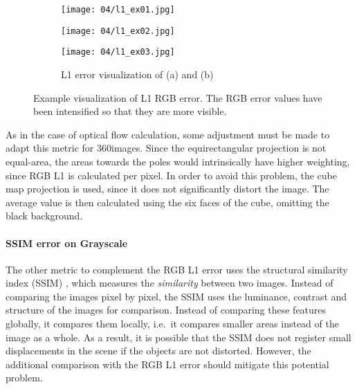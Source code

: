 \begin{figure}
\centering
    \hfill
    \begin{subfigure}[t]{0.3\textwidth}
            \centering
            \texttt{[image: 04/l1\_ex01.jpg]}
            \caption{}
    \end{subfigure}%
    \hfill
    \begin{subfigure}[t]{0.3\textwidth}
            \centering
            \texttt{[image: 04/l1\_ex02.jpg]}
            \caption{}
    \end{subfigure}
    \hfill
    \begin{subfigure}[t]{0.3\textwidth}
            \centering
            \texttt{[image: 04/l1\_ex03.jpg]}
            \caption{L1 error visualization of (a) and (b)}
    \end{subfigure}%
    \hfill
    \hfill
  \caption[Example visualization of L1 RGB error]{Example visualization of L1 RGB error. The RGB error values have been intensified so that they are more visible.} \label{fig:l1_example}
\end{figure}

As in the case of optical flow calculation, some adjustment must be made to adapt this metric for 360\degree images. Since the equirectangular projection is not equal-area, the areas towards the poles would intrinsically have higher weighting, since RGB L1 is calculated per pixel. In order to avoid this problem, the cube map projection is used, since it does not significantly distort the image. The average value is then calculated using the six faces of the cube, omitting the black background.

\paragraph{SSIM error on Grayscale}
The other metric to complement the RGB L1 error uses the structural similarity index (SSIM) \cite{ssim}, which measures the \emph{similarity} between two images. Instead of comparing the images pixel by pixel, the SSIM uses the luminance, contrast and structure of the images for comparison. Instead of comparing these features globally, it compares them locally, i.e.\ it compares smaller areas instead of the image as a whole. As a result, it is possible that the SSIM does not register small displacements in the scene if the objects are not distorted. However, the additional comparison with the RGB L1 error should mitigate this potential problem.

